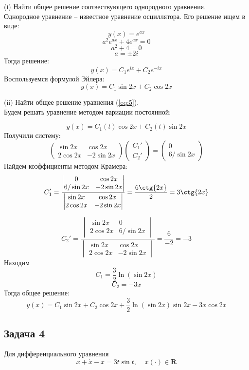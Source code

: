 \documentclass[a4paper, 12pt]{article}
\begin{document}
(i) Найти общее решение соотвествующего однородного уравнения.\\
Однородное уравнение -- известное уравнение осциллятора. Его решение ищем в виде:
\[y(x) = e^{ax}\]
\[a^2e^{ax}+4e^{ax}=0\]
\[a^2+4=0\]
\[a = \pm 2i\]
Тогда решение:
\[y(x)=C_1e^{ix}+C_2e^{-ix}\]
Воспользуемся формулой Эйлера:
\[y(x)= C_1\sin{2x}+C_2\cos{2x}\]

(ii) Найти общее решение уравнения (\ref{eq:5}).\\
Будем решать уравнение методом вариации постоянной:

\[y(x)= C_1(t)\cos{2x}+C_2(t)\sin{2x}\]
Получили систему:
\[ \left(
\begin{array}{cc}
\sin{2x} & \cos{2x} \\
2\cos{2x} & -2\sin{2x}
\end{array}
\right) \left(
\begin{array}{c}
C_1' \\
C_2'
\end{array} 
\right)= \left(
\begin{array}{c}
0 \\
6/\sin{2x}
\end{array}
\right) \]
Найдем коэффициенты методом Крамера:
\[C_1' = \frac{\begin{vmatrix}
0 & \cos{2x} \\
6/\sin{2x} & -2\sin{2x}
\end{vmatrix}}{\begin{vmatrix}
\sin{2x} & \cos{2x} \\
2\cos{2x} & -2\sin{2x}
\end{vmatrix}}= \frac {6\ctg{2x}}{2} = 3\ctg{2x}\]

\[C_2' = \frac{\begin{vmatrix}
\sin{2x} & 0 \\
2\cos{2x} & 6/\sin{2x}
\end{vmatrix}}{\begin{vmatrix}
\sin{2x} & \cos{2x} \\
2\cos{2x} & -2\sin{2x}
\end{vmatrix}}= \frac {6}{-2} = - 3\]
Находим 
\[C_1 = \frac 3 2 \ln{(\sin{2x})}\]
\[C_2=-3x\]
Тогда общее решение:
\[y(x) = C_1\sin{2x}+C_2\cos{2x}+\frac {3} {2} \ln{(\sin{2x})}\sin{2x}-3x\cos{2x}\]


	\subsection {Задача 4}

Для дифференциального уравнения
\begin{equation}
\ddot{x}+\dot{x}-x=3t\sin{t}, \;\;\;\; x(\cdot)\in \textbf{R}
\label{eq:6}
\end{equation}
\end{document}
